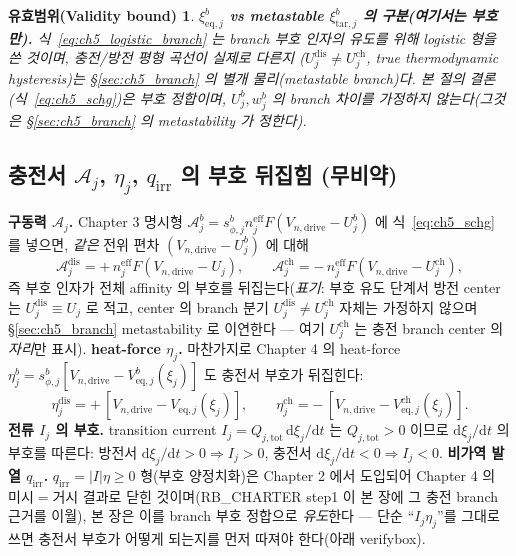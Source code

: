 \documentclass[11pt,a4paper]{article}
\newtheorem*{boundbox}{유효범위(Validity bound)}
\newcommand{\dd}{\mathrm{d}}
\newcommand{\eff}{\mathrm{eff}}
\newcommand{\eq}{\mathrm{eq}}
\newcommand{\drive}{\mathrm{drive}}
\newcommand{\tot}{\mathrm{tot}}
\newcommand{\irr}{\mathrm{irr}}
\newcommand{\dis}{\mathrm{dis}}
\newcommand{\chg}{\mathrm{ch}}
\newcommand{\tar}{\mathrm{tar}}
\begin{document}
\begin{boundbox}
\textbf{$\xi_{\eq,j}^b$ vs metastable $\xi_{\tar,j}^b$ 의 구분(여기서는 부호만).} 식~\eqref{eq:ch5_logistic_branch}
는 \emph{branch 부호 인자의 유도}를 위해 logistic 형을 쓴 것이며, 충전/방전 평형 곡선이 \emph{실제로 다른지}
($U_j^\dis\ne U_j^\chg$, true thermodynamic hysteresis)는 \S\ref{sec:ch5_branch} 의 별개 물리(metastable
branch)다. 본 절의 결론(식~\eqref{eq:ch5_schg})은 \emph{부호 정합}이며, $U_j^b,w_j^b$ 의 branch 차이를
가정하지 않는다(그것은 \S\ref{sec:ch5_branch} 의 metastability 가 정한다).
\end{boundbox}

\subsection{충전서 $\mathcal A_j$, $\eta_j$, $q_\irr$ 의 부호 뒤집힘 (무비약)}\label{sec:ch5_sign_flip}
\textbf{구동력 $\mathcal A_j$.} Chapter 3 명시형 $\mathcal A_j^b=s_{\phi,j}^b n_j^{\eff}F(V_{n,\drive}-U_j^b)$
에 식~\eqref{eq:ch5_schg} 를 넣으면, \emph{같은} 전위 편차 $(V_{n,\drive}-U_j^b)$ 에 대해
\begin{equation}
\mathcal A_j^\dis=+\,n_j^{\eff}F(V_{n,\drive}-U_j),\qquad
\mathcal A_j^\chg=-\,n_j^{\eff}F(V_{n,\drive}-U_j^\chg),
\label{eq:ch5_A_branch}
\end{equation}
즉 부호 인자가 전체 affinity 의 부호를 뒤집는다(\emph{표기}: 부호 유도 단계서 방전 center 는 $U_j^\dis\equiv U_j$
로 적고, center 의 branch 분기 $U_j^\dis\ne U_j^\chg$ 자체는 가정하지 않으며 \S\ref{sec:ch5_branch} metastability 로
이연한다 — 여기 $U_j^\chg$ 는 충전 branch center 의 \emph{자리}만 표시). \textbf{heat-force $\eta_j$.} 마찬가지로 Chapter 4 의
heat-force $\eta_j^b=s_{\phi,j}^b[V_{n,\drive}-V_{\eq,j}^b(\xi_j)]$ 도 충전서 부호가 뒤집힌다:
\begin{equation}
\eta_j^\dis=+\,[V_{n,\drive}-V_{\eq,j}(\xi_j)],\qquad
\eta_j^\chg=-\,[V_{n,\drive}-V_{\eq,j}^\chg(\xi_j)].
\label{eq:ch5_eta_branch}
\end{equation}
\textbf{전류 $I_j$ 의 부호.} transition current $I_j=Q_{j,\tot}\,\dd\xi_j/\dd t$ 는 $Q_{j,\tot}>0$ 이므로
$\dd\xi_j/\dd t$ 의 부호를 따른다: 방전서 $\dd\xi_j/\dd t>0\Rightarrow I_j>0$, 충전서 $\dd\xi_j/\dd t<0\Rightarrow
I_j<0$. \textbf{비가역 발열 $q_\irr$.} $q_\irr=|I|\eta\ge0$ 형(부호 양정치화)은 Chapter 2 에서 도입되어
Chapter 4 의 미시$=$거시 결과로 닫힌 것이며(RB\_CHARTER step1 이 본 장에 그 충전 branch 근거를 이월), 본 장은
이를 branch 부호 정합으로 \emph{유도}한다 — 단순 ``$I_j\eta_j$''를 그대로 쓰면 충전서 부호가 어떻게 되는지를 먼저
따져야 한다(아래 verifybox).
\end{document}
